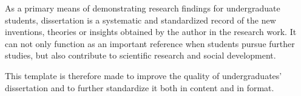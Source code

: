 As a primary means of demonstrating research findings for undergraduate
students, dissertation is a systematic and standardized record of the new
inventions, theories or insights obtained by the author in the research work.
It can not only function as an important reference when students pursue further
studies, but also contribute to scientific research and social development.

This template is therefore made to improve the quality of undergraduates'
dissertation and to further standardize it both in content and in format.
